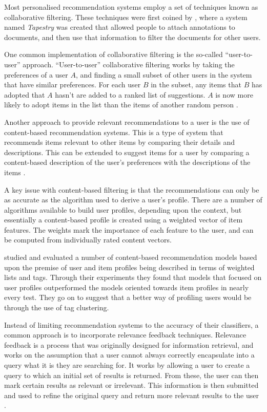 \documentclass[11pt,a4paper]{report}
\begin{document}
Most personalised recommendation systems employ a set of techniques known as collaborative filtering. These techniques were first coined by \textcite{Goldberg:1992}, where a system named \emph{Tapestry} was created that allowed people to attach annotations to documents, and then use that information to filter the documents for other users.

One common implementation of collaborative filtering is the so-called ``user-to-user'' approach. ``User-to-user'' collaborative filtering works by taking the preferences of a user $A$, and finding a small subset of other users in the system that have similar preferences. For each user $B$ in the subset, any items that $B$ has adopted that $A$ hasn't are added to a ranked list of suggestions. $A$ is now more likely to adopt items in the list than the items of another random person \parencite{Schafer:2001}.

Another approach to provide relevant recommendations to a user is the use of content-based recommendation systems. This is a type of system that recommends items relevant to other items by comparing their details and descriptions. This can be extended to suggest items for a user by comparing a content-based description of the user's preferences with the descriptions of the items \parencite{Pazzani:2007}.

A key issue with content-based filtering is that the recommendations can only be as accurate as the algorithm used to derive a user's profile. There are a number of algorithms available to build user profiles, depending upon the context, but essentially a content-based profile is created using a weighted vector of item features. The weights mark the importance of each feature to the user, and can be computed from individually rated content vectors.

\textcite{Cantador:2010} studied and evaluated a number of content-based recommendation models based upon the premise of user and item profiles being described in terms of weighted lists and tags. Through their experiments they found that models that focused on user profiles outperformed the models oriented towards item profiles in nearly every test. They go on to suggest that a better way of profiling users would be through the use of tag clustering.

Instead of limiting recommendation systems to the accuracy of their classifiers, a common approach is to incorporate relevance feedback techniques. Relevance feedback is a process that was originally designed for information retrieval, and works on the assumption that a user cannot always correctly encapsulate into a query what it is they are searching for. It works by allowing a user to create a query to which an initial set of results is returned. From these, the user can then mark certain results as relevant or irrelevant. This information is then submitted and used to refine the original query and return more relevant results to the user \parencite{Salton:1990}.
\end{document}
